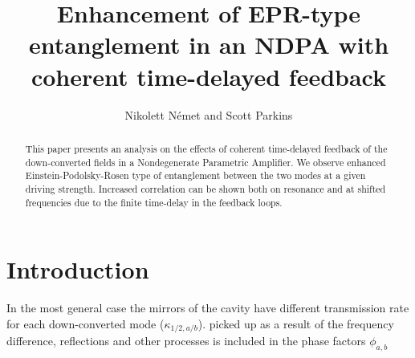 \documentclass[preprint,12pt]{elsarticle}
\begin{document}
\begin{frontmatter}

\title{Enhancement of EPR-type entanglement in an NDPA with coherent time-delayed feedback}

\author{Nikolett N\'emet and Scott Parkins}

\address{University of Auckland, Department of Physics and The Dodd-Walls Centre for Photonics and Quantum Technologies}
\begin{abstract}
This paper presents an analysis on the effects of coherent time-delayed feedback of the down-converted fields in a Nondegenerate Parametric Amplifier. We observe enhanced Einstein-Podolsky-Rosen type of entanglement between the two modes at a given driving strength. Increased correlation can be shown both on resonance and at shifted frequencies due to the finite time-delay in the feedback loops.
\end{abstract}
\end{frontmatter}
\linenumbers

\section{Introduction}

In the most general case the mirrors of the cavity have different transmission rate for each down-converted mode ($\kappa_{1/2,a/b}$).
picked up as a result of the frequency difference, reflections and other processes is included in the phase factors $\phi_{a,b}$
\end{document}
